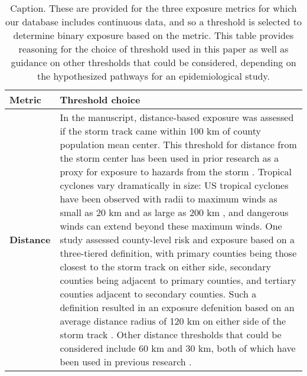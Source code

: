 \begin{table}
\caption{Caption. These are provided for the three exposure metrics for which our database includes continuous data, and so a threshold is selected to determine binary exposure based on the metric. This table provides reasoning for the choice of threshold used in this paper as well as guidance on other thresholds that could be considered, depending on the hypothesized pathways for an epidemiological study.}
\centering
\begin{tabular}{>{\bfseries\leavevmode\color{black}}l>{\raggedright\arraybackslash}p{40em}}
\toprule
Metric & Threshold choice\\
\midrule
Distance & In the manuscript, distance-based exposure was assessed if the storm track came within 100 km of county population mean center. This threshold for distance from the storm center has been used in prior research as a proxy for exposure to hazards from the storm \cite{grabich2015measuring}. Tropical cyclones vary dramatically in size: US tropical cyclones have been observed with radii to maximum winds as small as 20 km and as large as 200 km \cite{mallin2006, quiring2011variations}, and dangerous winds can extend beyond these maximum winds. One study \cite{czajkowski2011} assessed county-level risk and exposure based on a three-tiered definition, with primary counties being those closest to the storm track on either side, secondary counties being adjacent to primary counties, and tertiary counties adjacent to secondary counties. Such a definition resulted in an exposure defenition based on an average distance radius of 120 km on either side of the storm track \cite{czajkowski2011}. Other distance thresholds that could be considered include 60 km and 30 km, both of which have been used in previous research \cite{grabich2015measuring, grabich2015, currie2013}.\\

\end{tabular}
\end{table}
